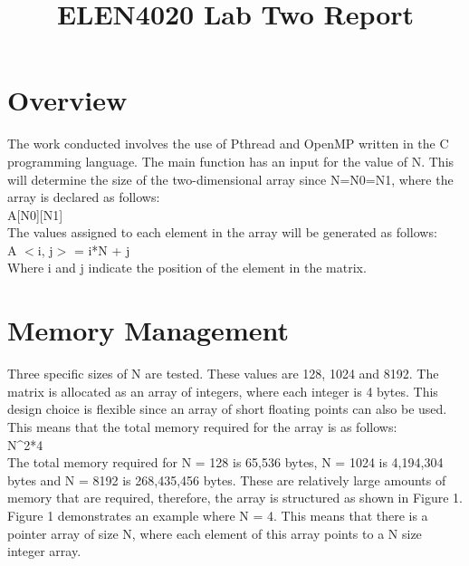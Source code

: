 \documentclass[conference]{IEEEtran}
\begin{document}
\title{ELEN4020 Lab Two Report}


\author{
}

\maketitle

\IEEEpeerreviewmaketitle

\section{Overview}

The work conducted involves the use of Pthread and OpenMP written in the C programming language. The main function has an input for the value of N. This will determine the size of the two-dimensional array since N=N0=N1, where the array is declared as follows:\\

A[N0][N1]\\

The values assigned to each element in the array will be generated as follows:\\

A $<$i, j$>$ = i*N + j\\

Where i and j indicate the position of the element in the matrix.



\section{Memory Management}

Three specific sizes of N are tested. These values are 128, 1024 and 8192. The matrix is allocated as an array of integers, where each integer is 4 bytes. This design choice is flexible since an array of short floating points can also be used. This means that the total memory required for the array is as follows:\\

N^2*4\\

The total memory required for N = 128 is 65,536 bytes, N = 1024 is 4,194,304 bytes and N = 8192 is 268,435,456 bytes. These are relatively large amounts of memory that are required, therefore, the array is structured as shown in Figure 1. Figure 1 demonstrates an example where N = 4. This means that there is a pointer array of size N, where each element of this array points to a N size integer array.
\end{document}
